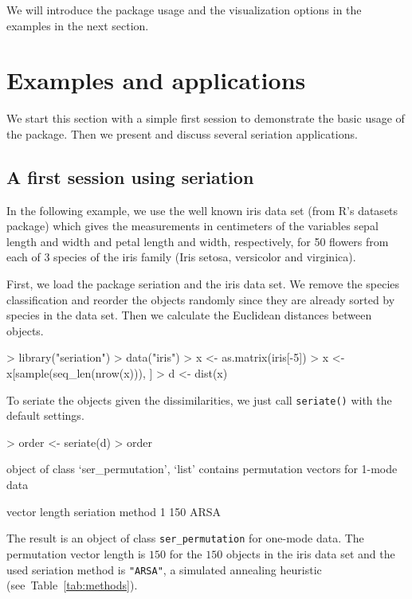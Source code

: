\documentclass[fleqn, a4paper]{article}
\newcommand{\strong}[1]{{\normalfont\fontseries{b}\selectfont #1}}
\newcommand{\func}[1]{\mbox{\texttt{#1()}}}
\newcommand{\code}[1]{\mbox{\texttt{#1}}}
\newcommand{\pkg}[1]{\strong{#1}}
\begin{document}
We will introduce the package usage and the visualization options
in the examples in the next section.

\section{Examples and applications}
\label{sec:example}


We start this section with a simple first session to demonstrate the basic
usage of the package. Then we present and discuss several seriation 
applications.

\subsection{A first session using \pkg{seriation}}
In the following example, we use the well known iris data set
(from R's \pkg{datasets} package) which gives the
measurements in centimeters of the variables sepal length and width and petal
length and width, respectively, for 50 flowers from each of 3 species of the
iris family (Iris setosa, versicolor and virginica). 

First, we load the package \pkg{seriation} and the iris data set.  We
remove the species classification and reorder the objects randomly since
they are already sorted by species in the data set. Then we calculate
the Euclidean distances between objects.

\begin{Schunk}
\begin{Sinput}
> library("seriation")
> data("iris")
> x <- as.matrix(iris[-5])
> x <- x[sample(seq_len(nrow(x))), ]
> d <- dist(x)
\end{Sinput}
\end{Schunk}

To seriate the objects given the dissimilarities, we just call
\func{seriate} with the default settings.

\begin{Schunk}
\begin{Sinput}
> order <- seriate(d)
> order
\end{Sinput}
\begin{Soutput}
object of class ‘ser_permutation’, ‘list’
contains permutation vectors for 1-mode data

  vector length seriation method
1           150             ARSA
\end{Soutput}
\end{Schunk}

The result is an object of class \code{ser\_permutation} for 
one-mode data. The permutation vector length is $150$ for the
$150$ objects in the iris data set and the used seriation method is
\code{"ARSA"}, a simulated annealing heuristic
(see~Table~\ref{tab:methods}).
\end{document}
